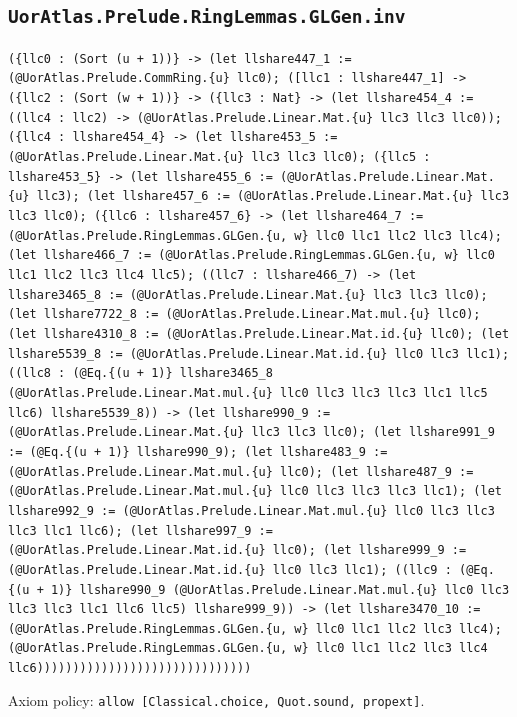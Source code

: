 \documentclass[11pt]{article}
\begin{document}
\subsection*{\texttt{UorAtlas.Prelude.RingLemmas.GLGen.inv}}
\noindent\texttt{(\{llc0 : (Sort (u + 1))\} -> (let llshare447\_1 := (@UorAtlas.Prelude.CommRing.\{u\} llc0); ([llc1 : llshare447\_1] -> (\{llc2 : (Sort (w + 1))\} -> (\{llc3 : Nat\} -> (let llshare454\_4 := ((llc4 : llc2) -> (@UorAtlas.Prelude.Linear.Mat.\{u\} llc3 llc3 llc0)); (\{llc4 : llshare454\_4\} -> (let llshare453\_5 := (@UorAtlas.Prelude.Linear.Mat.\{u\} llc3 llc3 llc0); (\{llc5 : llshare453\_5\} -> (let llshare455\_6 := (@UorAtlas.Prelude.Linear.Mat.\{u\} llc3); (let llshare457\_6 := (@UorAtlas.Prelude.Linear.Mat.\{u\} llc3 llc3 llc0); (\{llc6 : llshare457\_6\} -> (let llshare464\_7 := (@UorAtlas.Prelude.RingLemmas.GLGen.\{u, w\} llc0 llc1 llc2 llc3 llc4); (let llshare466\_7 := (@UorAtlas.Prelude.RingLemmas.GLGen.\{u, w\} llc0 llc1 llc2 llc3 llc4 llc5); ((llc7 : llshare466\_7) -> (let llshare3465\_8 := (@UorAtlas.Prelude.Linear.Mat.\{u\} llc3 llc3 llc0); (let llshare7722\_8 := (@UorAtlas.Prelude.Linear.Mat.mul.\{u\} llc0); (let llshare4310\_8 := (@UorAtlas.Prelude.Linear.Mat.id.\{u\} llc0); (let llshare5539\_8 := (@UorAtlas.Prelude.Linear.Mat.id.\{u\} llc0 llc3 llc1); ((llc8 : (@Eq.\{(u + 1)\} llshare3465\_8 (@UorAtlas.Prelude.Linear.Mat.mul.\{u\} llc0 llc3 llc3 llc3 llc1 llc5 llc6) llshare5539\_8)) -> (let llshare990\_9 := (@UorAtlas.Prelude.Linear.Mat.\{u\} llc3 llc3 llc0); (let llshare991\_9 := (@Eq.\{(u + 1)\} llshare990\_9); (let llshare483\_9 := (@UorAtlas.Prelude.Linear.Mat.mul.\{u\} llc0); (let llshare487\_9 := (@UorAtlas.Prelude.Linear.Mat.mul.\{u\} llc0 llc3 llc3 llc3 llc1); (let llshare992\_9 := (@UorAtlas.Prelude.Linear.Mat.mul.\{u\} llc0 llc3 llc3 llc3 llc1 llc6); (let llshare997\_9 := (@UorAtlas.Prelude.Linear.Mat.id.\{u\} llc0); (let llshare999\_9 := (@UorAtlas.Prelude.Linear.Mat.id.\{u\} llc0 llc3 llc1); ((llc9 : (@Eq.\{(u + 1)\} llshare990\_9 (@UorAtlas.Prelude.Linear.Mat.mul.\{u\} llc0 llc3 llc3 llc3 llc1 llc6 llc5) llshare999\_9)) -> (let llshare3470\_10 := (@UorAtlas.Prelude.RingLemmas.GLGen.\{u, w\} llc0 llc1 llc2 llc3 llc4); (@UorAtlas.Prelude.RingLemmas.GLGen.\{u, w\} llc0 llc1 llc2 llc3 llc4 llc6))))))))))))))))))))))))))))))}\par
\noindent Axiom policy: \texttt{allow [Classical.choice, Quot.sound, propext]}.\par
\end{document}

